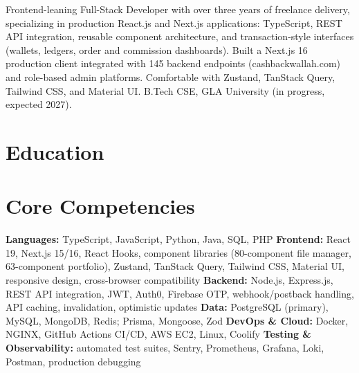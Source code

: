 \documentclass[11pt,a4paper,sans]{moderncv}
\begin{document}
\makecvtitle


\vspace{2pt}
\small{Frontend-leaning Full-Stack Developer with over three years of freelance delivery, specializing in production React.js and Next.js applications: TypeScript, REST API integration, reusable component architecture, and transaction-style interfaces (wallets, ledgers, order and commission dashboards). Built a Next.js 16 production client integrated with 145 backend endpoints (cashbackwallah.com) and role-based admin platforms. Comfortable with Zustand, TanStack Query, Tailwind CSS, and Material UI. B.Tech CSE, GLA University (in progress, expected 2027).}


\section{Education}
\vspace{1pt}


\section{Core Competencies}
\vspace{1pt}
\raggedright
\textbf{Languages:} TypeScript, JavaScript, Python, Java, SQL, PHP \textbar{}
\textbf{Frontend:} React 19, Next.js 15/16, React Hooks, component libraries (80-component file manager, 63-component portfolio), Zustand, TanStack Query, Tailwind CSS, Material UI, responsive design, cross-browser compatibility \textbar{}
\textbf{Backend:} Node.js, Express.js, REST API integration, JWT, Auth0, Firebase OTP, webhook/postback handling, API caching, invalidation, optimistic updates \textbar{}
\textbf{Data:} PostgreSQL (primary), MySQL, MongoDB, Redis; Prisma, Mongoose, Zod \textbar{}
\textbf{DevOps \& Cloud:} Docker, NGINX, GitHub Actions CI/CD, AWS EC2, Linux, Coolify \textbar{}
\textbf{Testing \& Observability:} automated test suites, Sentry, Prometheus, Grafana, Loki, Postman, production debugging
\par\normalfont
\end{document}
